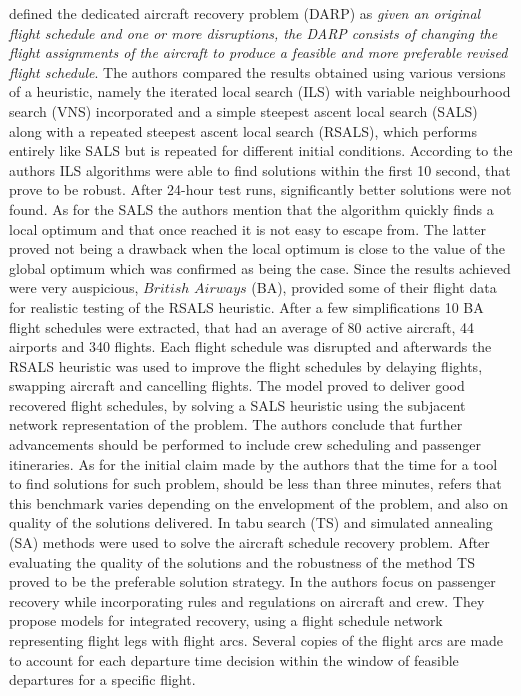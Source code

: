\documentclass[ijoo,nonblindrev]{informs-ijoo}
\begin{document}
\citep{Love2001} defined the dedicated aircraft recovery problem (DARP) as \textit{given an original flight schedule and one or more disruptions, the DARP consists of changing  the flight assignments of the aircraft to produce a feasible and more preferable revised flight schedule}. The authors compared the results obtained using various versions of a heuristic, namely the iterated local search (ILS) with variable neighbourhood search (VNS) incorporated and a simple steepest ascent local search (SALS) along with a repeated steepest ascent local search (RSALS), which performs entirely like SALS but is repeated for different initial conditions. According to the authors ILS algorithms were able to find solutions within the first 10 second, that prove to be robust. After 24-hour test runs, significantly better solutions were not found. As for the SALS the authors mention that the algorithm quickly finds a local optimum and that once reached it is not easy to escape from. The latter proved not being a drawback when the local optimum is close to the value of the global optimum which was confirmed as being the case. Since the results achieved were very auspicious, $British$ $Airways$ (BA), provided some of their flight data for realistic testing of the RSALS heuristic. After a few simplifications 10 BA flight schedules were extracted, that had an average of 80 active aircraft, 44 airports and 340 flights. Each flight schedule was disrupted and afterwards the RSALS heuristic was used to improve the flight schedules by delaying flights, swapping aircraft and cancelling flights.  The model proved to deliver good recovered flight schedules, by solving a SALS heuristic using the subjacent network representation of the problem. The authors conclude that further advancements should be performed to include crew scheduling and passenger itineraries.   As for the initial claim made by the authors that the time for a tool to find solutions for such problem, should be less than three minutes, \citep{Andersson:2006} refers that this benchmark varies depending on the envelopment of the problem, and also on quality of the solutions delivered.
In \citep{Andersson:2006} tabu search (TS) and simulated annealing (SA) methods were used to solve the aircraft schedule recovery problem. After evaluating the quality of the solutions and the robustness of the method TS proved to be the preferable solution strategy.
In \citep{Bratu2006} the authors focus on passenger recovery while incorporating rules and regulations on aircraft and crew. They propose models for integrated recovery, using a flight schedule network representing flight legs with flight arcs. Several copies of the flight arcs are made to account for each departure time decision within the window of feasible departures for a specific flight.\\
\end{document}
